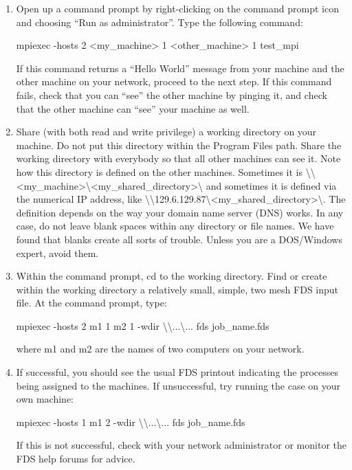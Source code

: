 \documentclass[11pt]{book}
\begin{document}
\begin{enumerate}
\item Open up a command prompt by right-clicking on the command prompt icon and choosing ``Run as administrator''. Type the following command:

    {\ct mpiexec -hosts 2 <my\_machine> 1 <other\_machine> 1 test\_mpi}

    If this command returns a ``Hello World'' message from your machine and the other machine on your network, proceed to the next step. If this command fails, check that you can ``see'' the other machine by pinging it, and check that the other machine can ``see'' your machine as well.

\item Share (with both read and write privilege) a working directory on your machine. Do not put this directory within the Program Files path. Share the working directory with everybody so that all other machines can see it. Note how this directory is defined on the other machines. Sometimes it is {\ct \textbackslash\textbackslash<my\_machine>\textbackslash<my\_shared\_directory>\textbackslash} and sometimes it is defined via the numerical IP address, like {\ct \textbackslash\textbackslash129.6.129.87\textbackslash<my\_shared\_directory>\textbackslash}. The definition depends on the way your domain name server (DNS) works. In any case, do not leave blank spaces within any directory or file names. We have found that blanks create all sorts of trouble. Unless you are a DOS/Windows expert, avoid them.

\item Within the command prompt, {\ct cd} to the working directory. Find or create within the working directory a relatively small, simple, two mesh FDS input file. At the command prompt, type:

   {\ct mpiexec -hosts 2 m1 1 m2 1 -wdir \textbackslash\textbackslash...\textbackslash... fds job\_name.fds}

   where {\ct m1} and {\ct m2} are the names of two computers on your network.

\item If successful, you should see the usual FDS printout indicating the processes being assigned to the machines. If unsuccessful, try running the case on your own machine:

   {\ct mpiexec -hosts 1 m1 2 -wdir \textbackslash\textbackslash...\textbackslash... fds job\_name.fds}

   If this is not successful, check with your network administrator or monitor the FDS help forums for advice.
\end{enumerate}
\end{document}
